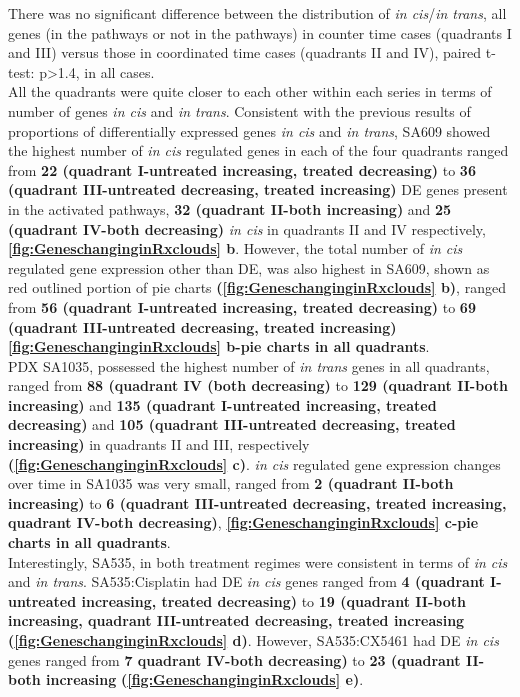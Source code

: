There was no significant difference between the distribution of \textit{in cis}/\textit{in trans}, all genes (in the pathways or not in the pathways) in counter time cases (quadrants I and III) versus those in coordinated time cases (quadrants II and IV), paired t-test: p>1.4, in all cases.
\\
All the quadrants were quite closer to each other within each series in terms of number of genes \textit{in cis} and \textit{in trans}.
Consistent with the previous results of proportions of differentially expressed genes \textit{in cis} and \textit{in trans}, SA609 showed the highest number of \textit{in cis} regulated genes in each of the four quadrants ranged from \textbf{22 (quadrant I-untreated increasing, treated decreasing)} to \textbf{36 (quadrant III-untreated decreasing, treated increasing)} DE genes present in the activated pathways, \textbf{32 (quadrant II-both increasing)} and \textbf{25 (quadrant IV-both decreasing)} \textit{in cis} in quadrants II and IV respectively, \textbf{\autoref{fig:GeneschanginginRxclouds} b}. However, the total number of \textit{in cis} regulated gene expression other than DE, was also highest in SA609, shown as red outlined portion of pie charts \textbf{(\autoref{fig:GeneschanginginRxclouds} b)}, ranged from \textbf{56 (quadrant I-untreated increasing, treated decreasing)} to \textbf{69 (quadrant III-untreated decreasing, treated increasing)} \textbf{\autoref{fig:GeneschanginginRxclouds} b-pie charts in all quadrants}. 
\\
PDX SA1035, possessed the highest number of \textit{in trans} genes in all quadrants, ranged from \textbf{88 (quadrant IV (both decreasing)} to \textbf{129 (quadrant II-both increasing)} and \textbf{135 (quadrant I-untreated increasing, treated decreasing)} and \textbf{105 (quadrant III-untreated decreasing, treated increasing)} in quadrants II and III, respectively \textbf{(\autoref{fig:GeneschanginginRxclouds} c)}. \textit{in cis} regulated gene expression changes over time in SA1035 was very small, ranged from \textbf{2 (quadrant II-both increasing)} to \textbf{6 (quadrant III-untreated decreasing, treated increasing, quadrant IV-both decreasing)}, \textbf{\autoref{fig:GeneschanginginRxclouds} c-pie charts in all quadrants}. 
\\
Interestingly, SA535, in both treatment regimes were consistent in terms of \textit{in cis} and \textit{in trans}. SA535:Cisplatin had DE \textit{in cis} genes ranged from \textbf{4 (quadrant I-untreated increasing, treated decreasing)} to \textbf{19 (quadrant II-both increasing, quadrant III-untreated decreasing, treated increasing} \textbf{(\autoref{fig:GeneschanginginRxclouds} d)}. However, SA535:CX5461 had DE \textit{in cis} genes ranged from \textbf{7 quadrant IV-both decreasing)} to \textbf{23 (quadrant II-both increasing} \textbf{(\autoref{fig:GeneschanginginRxclouds} e)}.




